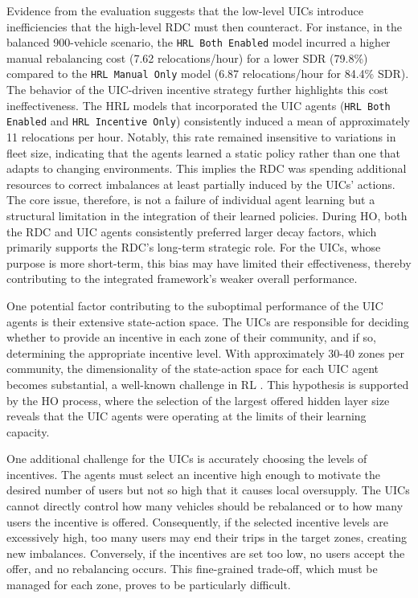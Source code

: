 Evidence from the evaluation suggests that the low-level UICs introduce inefficiencies that the high-level RDC must then counteract.
For instance, in the balanced 900-vehicle scenario, the \texttt{HRL Both Enabled} model incurred a higher manual rebalancing cost (7.62 relocations/hour) for a lower SDR (79.8\%) compared to the \texttt{HRL Manual Only} model (6.87 relocations/hour for 84.4\% SDR).
The behavior of the UIC-driven incentive strategy further highlights this cost ineffectiveness.
The HRL models that incorporated the UIC agents (\texttt{HRL Both Enabled} and \texttt{HRL Incentive Only}) consistently induced a mean of approximately 11 relocations per hour.
Notably, this rate remained insensitive to variations in fleet size, indicating that the agents learned a static policy rather than one that adapts to changing environments.
This implies the RDC was spending additional resources to correct imbalances at least partially induced by the UICs' actions.
The core issue, therefore, is not a failure of individual agent learning but a structural limitation in the integration of their learned policies.
During HO, both the RDC and UIC agents consistently preferred larger decay factors, which primarily supports the RDC's long-term strategic role.
For the UICs, whose purpose is more short-term, this bias may have limited their effectiveness, thereby contributing to the integrated framework's weaker overall performance.

One potential factor contributing to the suboptimal performance of the UIC agents is their extensive state-action space.
The UICs are responsible for deciding whether to provide an incentive in each zone of their community, and if so, determining the appropriate incentive level.
With approximately 30-40 zones per community, the dimensionality of the state-action space for each UIC agent becomes substantial, a well-known challenge in RL \cite{sutton_reinforcement_2018}.
This hypothesis is supported by the HO process, where the selection of the largest offered hidden layer size reveals that the UIC agents were operating at the limits of their learning capacity.

One additional challenge for the UICs is accurately choosing the levels of incentives.
The agents must select an incentive high enough to motivate the desired number of users but not so high that it causes local oversupply.
The UICs cannot directly control how many vehicles should be rebalanced or to how many users the incentive is offered.
Consequently, if the selected incentive levels are excessively high, too many users may end their trips in the target zones, creating new imbalances.
Conversely, if the incentives are set too low, no users accept the offer, and no rebalancing occurs.
This fine-grained trade-off, which must be managed for each zone, proves to be particularly difficult.

